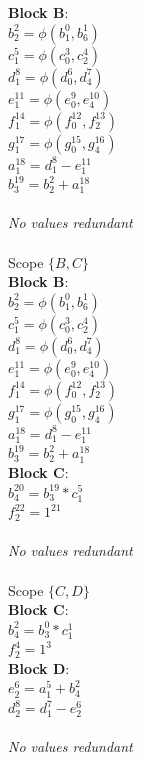 \documentclass[11pt]{article}
\begin{document}
\begin{enumerate}
\begin{Answer}
		\textbf{Block B}: \\
		$b_2^2 = \phi(b_1^0, b_6^1)$ \\
		$c_1^5 = \phi(c_0^3, c_2^4)$ \\
		$d_1^8 = \phi(d_0^6, d_4^7)$ \\
		$e_1^{11} = \phi(e_0^9, e_4^{10})$ \\
		$f_1^{14} = \phi(f_0^{12}, f_2^{13})$ \\
		$g_1^{17} = \phi(g_0^{15}, g_4^{16})$ \\
		$a_1^{18} = d_1^8 - e_1^{11}$ \\
		$b_3^{19} = b_2^2 + a_1^{18}$ \\
		\\
		\textit{No values redundant} \\ 
		\\
		
		Scope $\{B, C\}$ \\
		\textbf{Block B}: \\
		$b_2^2 = \phi(b_1^0, b_6^1)$ \\
		$c_1^5 = \phi(c_0^3, c_2^4)$ \\
		$d_1^8 = \phi(d_0^6, d_4^7)$ \\
		$e_1^{11} = \phi(e_0^9, e_4^{10})$ \\
		$f_1^{14} = \phi(f_0^{12}, f_2^{13})$ \\
		$g_1^{17} = \phi(g_0^{15}, g_4^{16})$ \\
		$a_1^{18} = d_1^8 - e_1^{11}$ \\
		$b_3^{19} = b_2^2 + a_1^{18}$ \\
		\textbf{Block C}: \\
		$b_4^{20} = b_3^{19} * c_1^5$ \\
		$f_2^{22} = 1^{21}$ \\
		\\
		\textit{No values redundant} \\ 
		\\
		
		Scope $\{C, D\}$ \\
		\textbf{Block C}: \\
		$b_4^2 = b_3^0 * c_1^1$ \\
		$f_2^4 = 1^3$ \\
		\textbf{Block D}: \\
		$e_2^6 = a_1^5 + b_4^2$ \\
		$d_2^8 = d_1^7 - e_2^6$ \\
		\\
		\textit{No values redundant} \\ 
		\\
		

\end{Answer}
\end{enumerate}
\end{document}
